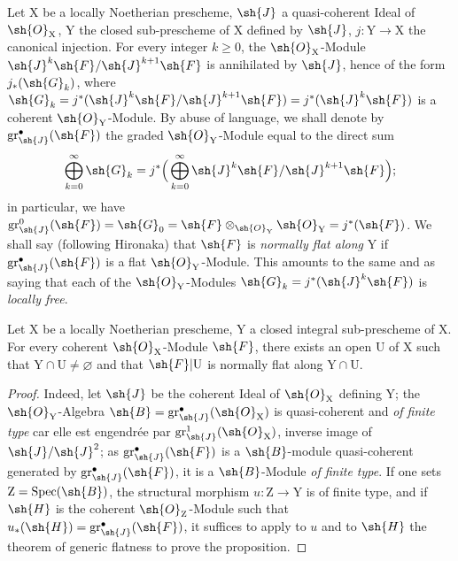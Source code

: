 \begin{env}[6.10.1]
\label{IV.6.10.1}
Let $\mathrm{X}$ be a locally Noetherian prescheme, $\sh{J}$ a quasi-coherent Ideal of $\sh{O}_\mathrm{X}$, $\mathrm{Y}$ the closed sub-prescheme of $\mathrm{X}$ defined by $\sh{J}$, $j:\mathrm{Y}\to\mathrm{X}$ the canonical injection. For every integer $k\geqslant 0$, the $\sh{O}_\mathrm{X}$-Module $\sh{J}^k\sh{F}/\sh{J}^{k+1}\sh{F}$ is annihilated by $\sh{J}$, hence of the form $j_*(\sh{G}_k)$, where $\sh{G}_k=j^*(\sh{J}^k\sh{F}/\sh{J}^{k+1}\sh{F})=j^*(\sh{J}^k\sh{F})$ is a coherent $\sh{O}_\mathrm{Y}$-Module. By abuse of language, we shall denote by $\operatorname{gr}^{\bullet}_\sh{J}(\sh{F})$ the graded $\sh{O}_\mathrm{Y}$-Module equal to the direct sum
\[
\bigoplus_{k=0}^{\infty}\sh{G}_k = j^*\Big(\bigoplus_{k=0}^{\infty}\sh{J}^k\sh{F}/\sh{J}^{k+1}\sh{F}\Big);
\]
in particular, we have $\operatorname{gr}^0_\sh{J}(\sh{F})=\sh{G}_0=\sh{F}\otimes_{\sh{O}_\mathrm{Y}}\sh{O}_\mathrm{Y}=j^*(\sh{F})$. We shall say (following Hironaka) that $\sh{F}$ is \emph{normally flat along} $\mathrm{Y}$ if $\operatorname{gr}^{\bullet}_\sh{J}(\sh{F})$ is a flat $\sh{O}_\mathrm{Y}$-Module. This amounts to the same  and  as saying that each of the $\sh{O}_\mathrm{Y}$-Modules $\sh{G}_k=j^*(\sh{J}^k\sh{F})$ is \emph{locally free}.
\end{env}

\begin{proposition}[6.10.2]
\label{IV.6.10.2}
Let $\mathrm{X}$ be a locally Noetherian prescheme, $\mathrm{Y}$ a closed integral sub-prescheme of $\mathrm{X}$. For every coherent $\sh{O}_\mathrm{X}$-Module $\sh{F}$, there exists an open $\mathrm{U}$ of $\mathrm{X}$ such that $\mathrm{Y}\cap\mathrm{U}\neq\varnothing$ and that $\sh{F}|\mathrm{U}$ is normally flat along $\mathrm{Y}\cap\mathrm{U}$.
\end{proposition}

\begin{proof}
Indeed, let $\sh{J}$ be the coherent Ideal of $\sh{O}_\mathrm{X}$ defining $\mathrm{Y}$; the $\sh{O}_\mathrm{Y}$-Algebra $\sh{B}=\operatorname{gr}^{\bullet}_\sh{J}(\sh{O}_\mathrm{X})$ is quasi-coherent and \emph{of finite type} car elle est engendr\'ee par $\operatorname{gr}^1_\sh{J}(\sh{O}_\mathrm{X})$, inverse image of $\sh{J}/\sh{J}^2$; as $\operatorname{gr}^{\bullet}_\sh{J}(\sh{F})$ is a $\sh{B}$-module quasi-coherent generated by $\operatorname{gr}^{\bullet}_\sh{J}(\sh{F})$, it is a $\sh{B}$-Module \emph{of finite type}. If one sets $\mathrm{Z}=\operatorname{Spec}(\sh{B})$, the structural morphism $u:\mathrm{Z}\to\mathrm{Y}$ is of finite type, and if $\sh{H}$ is the coherent $\sh{O}_\mathrm{Z}$-Module such that $u_*(\sh{H})=\operatorname{gr}^{\bullet}_\sh{J}(\sh{F})$, it suffices to apply to $u$ and to $\sh{H}$ the theorem of generic flatness  to prove the proposition.
\end{proof}


